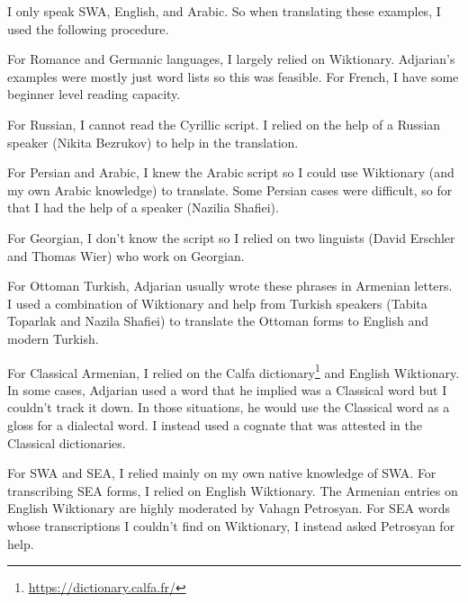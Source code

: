 I only speak SWA, English, and Arabic. So when translating these examples, I used the following procedure. 

For Romance and Germanic languages, I largely relied on Wiktionary. Adjarian's examples were mostly just word lists so this was feasible. For French, I have some beginner level reading capacity. 

For Russian, I cannot read the Cyrillic script. I relied on the help of  a Russian speaker (Nikita Bezrukov) to help in the translation. 

For Persian and Arabic, I knew the Arabic script so I could use Wiktionary (and my own Arabic knowledge) to translate. Some Persian cases were difficult, so for that I had the help of a speaker (Nazilia Shafiei). 

For Georgian, I don't know the script so I relied on two linguists (David Erschler and Thomas Wier) who work on Georgian. 

For Ottoman Turkish, Adjarian usually wrote these phrases in Armenian letters. I used a combination of Wiktionary and help from Turkish speakers (Tabita Toparlak and Nazila Shafiei) to translate the Ottoman forms to English and modern Turkish. 

For Classical Armenian, I relied on the Calfa dictionary\footnote{\url{https://dictionary.calfa.fr/}} and English Wiktionary. In some cases, Adjarian used a word that he implied was a Classical word but I couldn't track it down. In those situations, he would use the Classical word as a gloss for a  dialectal word. I instead used a cognate that was attested in the Classical dictionaries. 

For SWA and SEA, I relied mainly on my own native knowledge of SWA. For transcribing SEA forms, I relied on English Wiktionary. The Armenian entries on English Wiktionary are highly moderated by Vahagn Petrosyan. For SEA words whose transcriptions I couldn't find on Wiktionary, I instead asked Petrosyan for help. 


